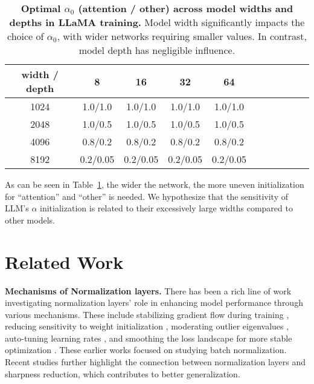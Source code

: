 \documentclass[]{fairmeta}
\newcommand{\tablestyle}[2]{\setlength{\tabcolsep}{#1}\renewcommand{\arraystretch}{#2}\centering\footnotesize}
\renewcommand{\paragraph}[1]{\vspace{1.25mm}\noindent\textbf{#1}}
\begin{document}
\begin{table}[t]
\vskip 0.1in
\centering
\tablestyle{7pt}{1.15}
\begin{tabular}{ccccccccccc}
\toprule
 width / depth & 8 & 16 & 32 & 64 \\
\midrule
1024 & 1.0/1.0 & 1.0/1.0 & 1.0/1.0 & 1.0/1.0 \\
2048 & 1.0/0.5 & 1.0/0.5 & 1.0/0.5 & 1.0/0.5 \\
4096 & 0.8/0.2 & 0.8/0.2 & 0.8/0.2 & 0.8/0.2 \\
8192 & 0.2/0.05 & 0.2/0.05 & 0.2/0.05 & 0.2/0.05 \\
\midrule
\end{tabular}
\caption{\textbf{Optimal $\alpha_0$ (attention / other) across model widths and depths in LLaMA training.} Model width significantly impacts the choice of $\alpha_0$, with wider networks requiring smaller values. In contrast, model depth has negligible influence.}
\label{table:width_depth}
\end{table}

As can be seen in Table~\ref{table:width_depth}, the wider the network, the more uneven initialization for ``attention'' and ``other'' is needed. We hypothesize that the sensitivity of LLM's $\alpha$ initialization is related to their excessively large widths compared to other models. 









\section{Related Work}

\paragraph{Mechanisms of Normalization layers.}
There has been a rich line of work investigating normalization layers' role in enhancing model performance through various mechanisms.
These include stabilizing gradient flow during training \citep{balduzzi2017shattered, daneshmand2020batch, lubana2021beyond}, reducing sensitivity to weight initialization \citep{zhang2019fixup, de2020batch, shao2020normalization}, moderating outlier eigenvalues \citep{bjorck2018understanding,karakida2019normalization}, auto-tuning learning rates \citep{arora2018theoretical,tanaka2021noether}, and smoothing the loss landscape for more stable optimization \citep{santurkar2018does}.
These earlier works focused on studying batch normalization. Recent studies \citep{lyu2022understanding, dai2024crucial, mueller2024normalization} further highlight the connection between normalization layers and sharpness reduction, which contributes to better generalization.
\end{document}

